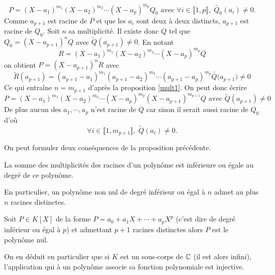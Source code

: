 \begin{demo}
\begin{displaymath}
P = (X - a_1)^{m_1}(X - a_2)^{m_2} \cdots (X - a_p)^{m_p} Q_0 \text{ avec }
 \forall i\in \llbracket 1,p\rrbracket,\;\widetilde{Q_0}(a_i)\neq 0.  
\end{displaymath}
Comme $a_{p+1}$ est racine de $P$ et que les $a_i$ sont deux à deux distincts, $a_{p+1}$ est racine de $Q_0$. Soit $n$ sa multiplicité. Il existe donc $Q$ tel que $Q_0=(X-a_{p+1})^nQ$ avec $\widetilde{Q}(a_{p+1})\neq 0$. En notant 
\begin{displaymath}
  R = (X-a_1)^{m_1}(X-a_2)^{m_2}\cdots(X-a_p)^{m_p} Q
\end{displaymath}
on obtient $P = (X-a_{p+1})^n R$ avec 
\begin{displaymath}
   \widetilde{R}(a_{p+1}) = 
  (a_{p+1} - a_1)^{m_1}(a_{p+1} - a_2)^{m_2}\cdots(a_{p+1} - a_p)^{m_p} \widetilde{Q(}a_{p+1}) \neq 0
\end{displaymath}
Ce qui entraîne $n = m_{p+1}$ d'après la proposition \ref{mult1}. On peut donc écrire
\begin{displaymath}
 P = (X - a_1)^{m_1}(X - a_2)^{m_2}\cdots(X - a_p)^{m_p}(X - a_{p+1})^{m_{p+1}}Q 
\text{ avec } \widetilde{Q}(a_{p+1})\neq 0
\end{displaymath}
De plus aucun des $a_1,\cdots, a_p$ n'est racine de $Q$ car sinon il serait aussi racine de $Q_0$ d'où
\[
 \forall i \in  \llbracket 1, m_{p+1} \rrbracket, \; \widetilde{Q}(a_i) \neq 0.
\]
\end{demo}

On peut formuler deux conséquences de la proposition précédente.
\begin{propn}
 La somme des multiplicités des racines d'un polynôme est inférieure ou égale au degré de ce polynôme.
\end{propn}
En particulier, un polynôme non nul de degré inférieur ou égal à $n$ admet au plus $n$ racines distinctes. 
\begin{propn}
 Soit $P\in K[X]$ de la forme $P = a_0+a_1X + \cdots +a_pX^p$ (c'est dire de degré inférieur ou égal à $p$) et admettant $p+1$ racines distinctes alors $P$ est le polynôme nul.
\end{propn}
On en déduit en particulier que si $K$ est un sous-corps de $\mathbb{C}$ (il est alors infini), l'application qui à un polynôme associe sa fonction polynomiale est injective.

